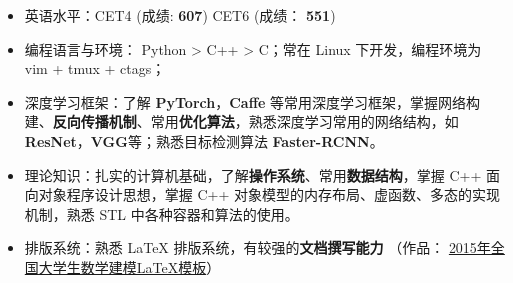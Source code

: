\documentclass[paper=a4,fontsize=11pt,svgnames]{temp} %
\begin{document}
\noindent
\vspace*{-.9cm}
\hspace*{0cm}
\begin{minipage}{.96\textwidth}
\begin{itemize}
	\item 英语水平：CET4 (成绩: \textbf{607}) \hspace*{1cm} CET6 (成绩： \textbf{551})
	\item 编程语言与环境： Python > C++ > C；常在 Linux 下开发，编程环境为 vim + tmux + ctags；
	\item 深度学习框架：了解 \textbf{PyTorch}，\textbf{Caffe} 等常用深度学习框架，掌握网络构建、\textbf{反向传播机制}、常用\textbf{优化算法}，熟悉深度学习常用的网络结构，如 \textbf{ResNet}，\textbf{VGG}等；熟悉目标检测算法 \textbf{Faster-RCNN}。
	\item 理论知识：扎实的计算机基础，了解\textbf{操作系统}、常用\textbf{数据结构}，掌握 C++ 面向对象程序设计思想，掌握 C++ 对象模型的内存布局、虚函数、多态的实现机制，熟悉 STL 中各种容器和算法的使用。
	\item 排版系统：熟悉 \LaTeX{} 排版系统，有较强的\textbf{文档撰写能力} （作品：
	\href{http://www.latexstudio.net/archives/4200}{2015年全国大学生数学建模LaTeX模板}）
\end{itemize}
\end{minipage}

\end{document}
